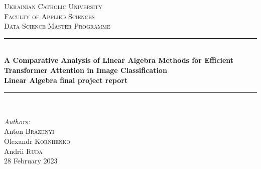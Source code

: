 \begin{titlepage}

\newcommand{\HRule}{\rule{\linewidth}{0.5mm}} %

\center %
 

\textsc{\LARGE Ukrainian Catholic University}\\[1cm] %
\textsc{\Large  Faculty of Applied Sciences}\\[0.5cm] %
\textsc{\large Data Science Master Programme}\\[0.5cm] %

\vspace*{1cm}

\HRule \\[0.4cm]
{ \huge \bfseries A Comparative Analysis of Linear Algebra Methods for Efficient Transformer Attention in Image Classification}\\[10pt]
{\Large \bfseries Linear Algebra final project report}\\[0.4cm] %
\HRule \\[0.8cm]
 
\vspace*{0.5cm}

\Large \emph{Authors:}\\
Anton \textsc{Brazhnyi}\\Olexandr \textsc{Korniienko}\\Andrii \textsc{Ruda}\\[1cm] %

\vspace*{1cm}
{\large 28 February 2023}\\[2cm] %


\end{titlepage}
